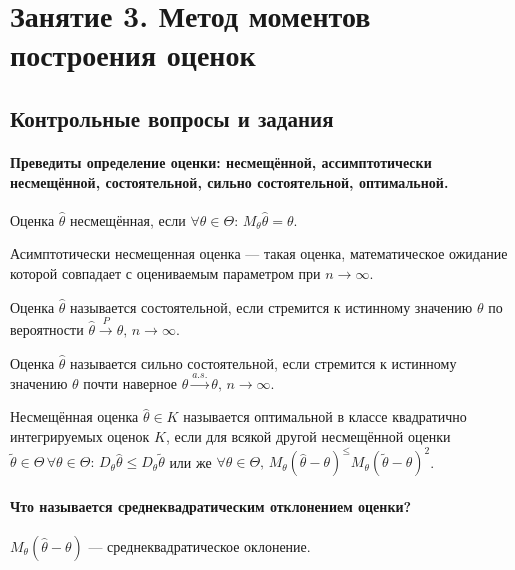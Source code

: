 \chapter*{Занятие 3. Метод моментов построения оценок}

\section*{Контрольные вопросы и задания}

\subsubsection*{Преведиты определение оценки: несмещённой, ассимптотически несмещённой,
                состоятельной, сильно состоятельной, оптимальной.}

Оценка $ \hat{ \theta}$  несмещённая,
если $ \forall \theta \in \Theta: \, M_{ \theta } \hat{ \theta } = \theta $.

Асимптотически несмещенная оценка --- такая оценка,
математическое ожидание которой совпадает с оцениваемым параметром при $n \to \infty $.

Оценка $ \hat{ \theta }$ называется состоятельной,
если стремится к истинному значению $ \theta $ по вероятности
$ \hat{ \theta } \overset{P}{ \rightarrow } \theta, \,
  n \to \infty $.

Оценка $ \hat{ \theta }$ называется сильно состоятельной,
если стремится к истинному значению $ \theta $ почти наверное
$ \hat{ \theta } \overset{a.s.}{ \rightarrow } \theta, \,
  n \to \infty $.

Несмещённая оценка $ \hat{ \theta } \in K$
называется оптимальной в классе квадратично интегрируемых оценок $K$,
если для всякой другой несмещённой оценки
$ \tilde{ \theta } \in \Theta \,
  \forall \theta \in \Theta: \,
  D_{ \theta } \hat{ \theta } \leq D_{ \theta } \tilde{ \theta }$
или же
$ \forall \theta \in \Theta, \,
  M_{ \theta } \left( \hat{ \theta } - \theta \right)^ \leq
  M_{ \theta } \left( \tilde{ \theta } - \theta \right)^2$.

\subsubsection*{Что называется среднеквадратическим отклонением оценки?}

$M_{ \theta } \left( \hat{ \theta } - \theta \right) $ --- среднеквадратическое оклонение.

